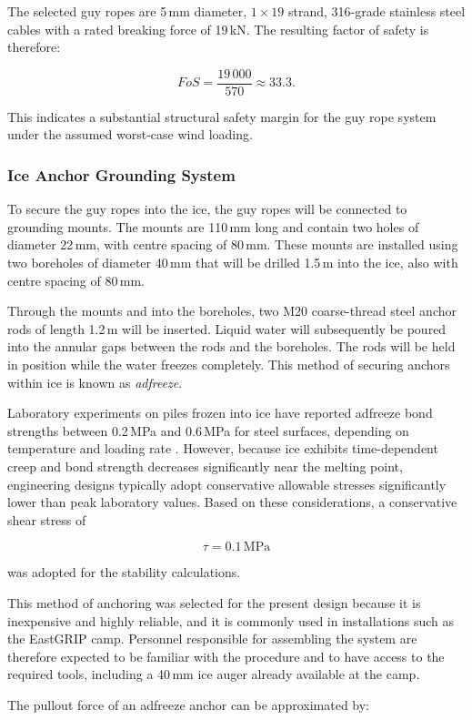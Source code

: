 \documentclass[11pt,a4paper]{article}
\begin{document}
The selected guy ropes are 5\,mm diameter, $1\times19$ strand, 316-grade stainless steel cables with a rated breaking force of 19\,kN. The resulting factor of safety is therefore:

\[
FoS = \frac{19\,000}{570} \approx 33.3.
\]

This indicates a substantial structural safety margin for the guy rope system under the assumed worst-case wind loading.

\subsubsection{Ice Anchor Grounding System}
To secure the guy ropes into the ice, the guy ropes will be connected to grounding mounts. The mounts are 110\,mm long and contain two holes of diameter 22\,mm, with centre spacing of 80\,mm. These mounts are installed using two boreholes of diameter 40\,mm that will be drilled 1.5\,m into the ice, also with centre spacing of 80\,mm. 

Through the mounts and into the boreholes, two M20 coarse-thread steel anchor rods of length 1.2\,m will be inserted. Liquid water will subsequently be poured into the annular gaps between the rods and the boreholes. The rods will be held in position while the water freezes completely. This method of securing anchors within ice is known as \textit{adfreeze}.

Laboratory experiments on piles frozen into ice have reported adfreeze bond strengths between 0.2\,MPa and 0.6\,MPa for steel surfaces, depending on temperature and loading rate \cite{adfreeze}. However, because ice exhibits time-dependent creep and bond strength decreases significantly near the melting point, engineering designs typically adopt conservative allowable stresses significantly lower than peak laboratory values. Based on these considerations, a conservative shear stress of

\[
\tau = 0.1\,\text{MPa}
\]

was adopted for the stability calculations.

This method of anchoring was selected for the present design because it is inexpensive and highly reliable, and it is commonly used in installations such as the EastGRIP camp. Personnel responsible for assembling the system are therefore expected to be familiar with the procedure and to have access to the required tools, including a 40\,mm ice auger already available at the camp.

The pullout force of an adfreeze anchor can be approximated by:
\end{document}

